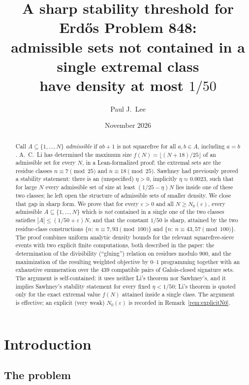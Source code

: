 \documentclass[11pt,a4paper]{article}
\title{A sharp stability threshold for Erd\H{o}s Problem 848:\\
admissible sets not contained in a single extremal class\\
have density at most $1/50$}
\author{Paul J.\ Lee}
\date{November 2026}
\theoremstyle{plain}
\theoremstyle{definition}
\theoremstyle{remark}
\begin{document}
\maketitle

\begin{abstract}
Call $A\subseteq\{1,\dots,N\}$ \emph{admissible} if $ab+1$ is not squarefree for all $a,b\in A$,
including $a=b$. A.~C.~Li has determined the maximum size $f(N)=\lfloor (N+18)/25\rfloor$ of an
admissible set for every $N$, in a Lean-formalized proof; the extremal sets
are the residue classes $n\equiv 7 \pmod{25}$ and $n\equiv 18\pmod{25}$. Sawhney had previously proved a
stability statement: there is an (unspecified) $\eta>0$, implicitly $\eta\approx 0.0023$, such that for
large $N$ every admissible set of size at least $(1/25-\eta)N$ lies inside one of these two classes;
he left open the structure of admissible sets of smaller density. We close that gap in sharp form.
We prove that for every $\varepsilon>0$ and all $N\ge N_0(\varepsilon)$, every admissible
$A\subseteq\{1,\dots,N\}$ which is \emph{not} contained in a single one of the two classes satisfies
$|A|\le (1/50+\varepsilon)N$, and that the constant $1/50$ is sharp, attained by the two
residue-class constructions $\{n:\ n\equiv 7,93 \pmod{100}\}$ and $\{n:\ n\equiv 43,57\pmod{100}\}$.
The proof combines uniform analytic density bounds for the relevant squarefree-sieve events with two
explicit finite computations, both described in the paper: the determination of the divisibility
(``gluing'') relation on residues modulo $900$, and the maximization of the resulting weighted
objective by $0$--$1$ programming together with an exhaustive enumeration over the $439$ compatible
pairs of Galois-closed signature sets. The argument is self-contained: it uses neither Li's theorem
nor Sawhney's, and it
implies Sawhney's stability statement for every fixed $\eta<1/50$; Li's theorem is quoted only for
the exact extremal value $f(N)$ attained inside a single class. The argument is effective; an
explicit (very weak) $N_0(\varepsilon)$ is recorded in Remark~\ref{rem:explicitN0}.
\end{abstract}

\section{Introduction}

\subsection{The problem}
\end{document}

